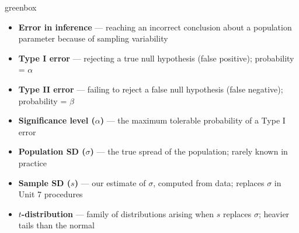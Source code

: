\documentclass[10pt]{article}
\begin{document}
\begin{skillbox}{greenbox}
\begin{minipage}[t]{0.48\linewidth}
    \begin{itemize}
        \item \textbf{Error in inference} --- reaching an incorrect conclusion about a
              population parameter because of sampling variability
        \item \textbf{Type I error} --- rejecting a true null hypothesis (false positive);
              probability = $\alpha$
        \item \textbf{Type II error} --- failing to reject a false null hypothesis
              (false negative); probability = $\beta$
    \end{itemize}
\end{minipage}
\hfill
\begin{minipage}[t]{0.48\linewidth}
    \begin{itemize}
        \item \textbf{Significance level ($\alpha$)} --- the maximum tolerable probability
              of a Type I error
        \item \textbf{Population SD ($\sigma$)} --- the true spread of the population;
              rarely known in practice
        \item \textbf{Sample SD ($s$)} --- our estimate of $\sigma$, computed from data;
              replaces $\sigma$ in Unit 7 procedures
        \item \textbf{$t$-distribution} --- family of distributions arising when $s$
              replaces $\sigma$; heavier tails than the normal
    \end{itemize}
\end{minipage}
\end{skillbox}
\end{document}
